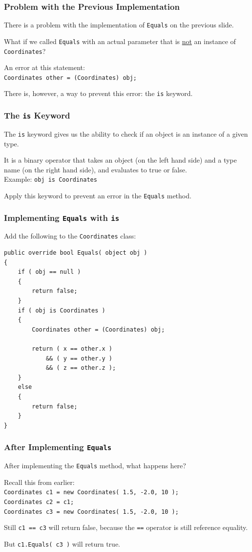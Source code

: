 \begin{frame}
\frametitle{Problem with the Previous Implementation}

There is a problem with the implementation of \texttt{Equals} on the previous slide.

What if we called \texttt{Equals} with an actual parameter that is \underline{not} an instance of \texttt{Coordinates}?

An error at this statement:\\
\quad \texttt{Coordinates other = (Coordinates) obj;}

There is, however, a way to prevent this error: the \alert{\texttt{is}} keyword.

\end{frame}

\begin{frame}
\frametitle{The \texttt{is} Keyword}

The \texttt{is} keyword gives us the ability to check if an object is an instance of a given type.

It is a binary operator that takes an object (on the left hand side) and a type name (on the right hand side), and evaluates to true or false.\\
\quad Example: \texttt{obj is Coordinates}

Apply this keyword to prevent an error in the \texttt{Equals} method.

\end{frame}

\begin{frame}[fragile]
\frametitle{Implementing \texttt{Equals} with \texttt{is}}
Add the following to the \texttt{Coordinates} class:

{\scriptsize
\begin{verbatim}
public override bool Equals( object obj )
{
    if ( obj == null )
    {
        return false;
    }
    if ( obj is Coordinates )
    {
        Coordinates other = (Coordinates) obj;
        
        return ( x == other.x ) 
            && ( y == other.y ) 
            && ( z == other.z );
    }
    else
    {
        return false;
    }
}
\end{verbatim}
}
\end{frame}

\begin{frame}
\frametitle{After Implementing \texttt{Equals}}

After implementing the \texttt{Equals} method, what happens here?

Recall this from earlier:\\
\texttt{Coordinates c1 = new Coordinates( 1.5, -2.0, 10 );}\\
\texttt{Coordinates c2 = c1; }\\
\texttt{Coordinates c3 = new Coordinates( 1.5, -2.0, 10 );}

Still \texttt{c1 == c3} will return false, because the \texttt{==} operator is still reference equality.

But \texttt{c1.Equals( c3 )} will return true.

\end{frame}

